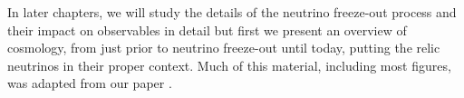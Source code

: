  In later chapters, we will study the details of the neutrino freeze-out process and their impact on observables in detail but first we present an overview of cosmology, from just prior to neutrino freeze-out until today, putting the relic neutrinos in their proper context. Much of this material, including most figures, was adapted from our paper \cite{ErasOfUniverse}.




